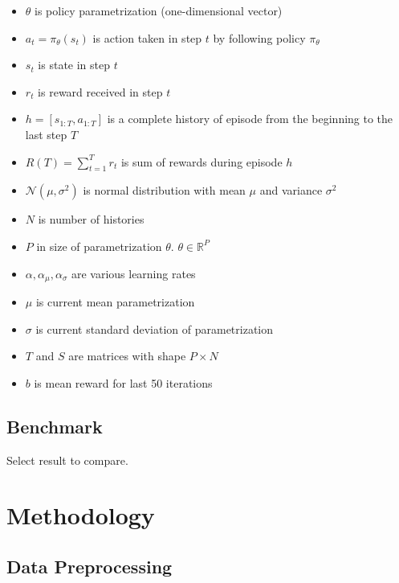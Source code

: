\documentclass[12pt]{article}
\begin{document}
\begin{itemize}

\item $\theta$ is policy parametrization (one-dimensional vector)

\item $a_t = \pi_\theta(s_t)$ is action taken in step $t$ by following policy $\pi_\theta$

\item $s_t$ is state in step $t$

\item $r_t$ is reward received in step $t$

\item $h = [s_{1:T}, a_{1:T}]$ is a complete history of episode from the beginning to the last step $T$
\item $R(T) = \sum_{t=1}^{T} r_t$ is sum of rewards during episode $h$

\item $\mathcal{N}(\mu, \sigma^2)$ is normal distribution with mean $\mu$ and variance $\sigma^2$

\item $N$ is number of histories
\item $P$ in size of parametrization $\theta$. $\theta \in \mathbb{R}^P$

\item $\alpha, \alpha_\mu, \alpha_\sigma$ are various learning rates

\item $\mu$ is current mean parametrization
\item $\sigma$ is current standard deviation of parametrization

\item $T$ and $S$ are matrices with shape $P\times N$

\item $b$ is mean reward for last 50 iterations

\end{itemize}


\subsection{Benchmark}

Select result to compare.

\section{Methodology}
\subsection{Data Preprocessing}
\end{document}
